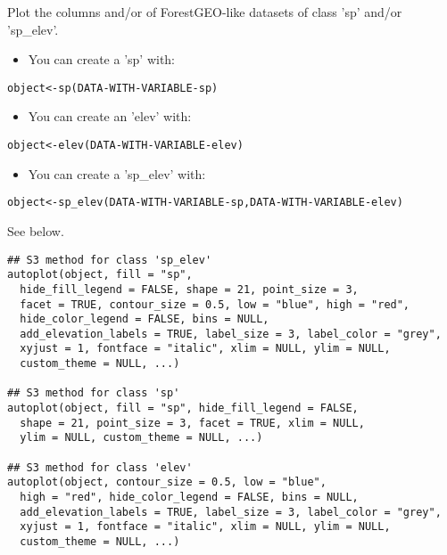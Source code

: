 \documentclass[a4paper]{book}
\begin{document}
\begin{Description}\relax
Plot the columns  and/or  of ForestGEO-like datasets of class 'sp'
and/or 'sp\_elev'.
\begin{itemize}

\item You can create a 'sp'  with:

\end{itemize}


\begin{alltt}    object <- sp(DATA-WITH-VARIABLE-sp)
\end{alltt}

\begin{itemize}

\item You can create an 'elev'  with:

\end{itemize}


\begin{alltt}    object <- elev(DATA-WITH-VARIABLE-elev)
\end{alltt}


\begin{itemize}

\item You can create a 'sp\_elev'  with:

\end{itemize}


\begin{alltt}    object <- sp_elev(DATA-WITH-VARIABLE-sp, DATA-WITH-VARIABLE-elev)
\end{alltt}


See  below.
\end{Description}
%
\begin{Usage}
\begin{verbatim}
## S3 method for class 'sp_elev'
autoplot(object, fill = "sp",
  hide_fill_legend = FALSE, shape = 21, point_size = 3,
  facet = TRUE, contour_size = 0.5, low = "blue", high = "red",
  hide_color_legend = FALSE, bins = NULL,
  add_elevation_labels = TRUE, label_size = 3, label_color = "grey",
  xyjust = 1, fontface = "italic", xlim = NULL, ylim = NULL,
  custom_theme = NULL, ...)

## S3 method for class 'sp'
autoplot(object, fill = "sp", hide_fill_legend = FALSE,
  shape = 21, point_size = 3, facet = TRUE, xlim = NULL,
  ylim = NULL, custom_theme = NULL, ...)

## S3 method for class 'elev'
autoplot(object, contour_size = 0.5, low = "blue",
  high = "red", hide_color_legend = FALSE, bins = NULL,
  add_elevation_labels = TRUE, label_size = 3, label_color = "grey",
  xyjust = 1, fontface = "italic", xlim = NULL, ylim = NULL,
  custom_theme = NULL, ...)
\end{verbatim}
\end{Usage}
\end{document}
